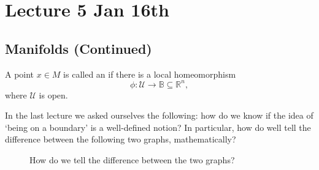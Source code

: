 \documentclass[notoc,notitlepage]{tufte-book}
\begin{document}


%
\label{prt:introduction_to_topological_manifolds}

\chapter{Lecture 5 Jan 16th}%
\label{chp:lecture_5_jan_16th}

\section{Manifolds (Continued)}%
\label{sec:manifolds_continued}

\begin{defn}\label{defn:interior_point}
  A point $x \in M$ is called an  if there is a local
  homeomorphism
  \begin{equation*}
    \phi : \mathcal{U} \to \mathbb{B} \subseteq \mathbb{R}^n,
  \end{equation*}
  where $\mathcal{U}$ is open.
\end{defn}

In the last lecture we asked ourselves the following: how do we know if the
idea of `being on a boundary' is a well-defined notion? In particular, how
do well tell the difference between the following two graphs, mathematically?

\begin{figure}[ht]
  \centering
  \caption{How do we tell the difference between the two graphs?}
  \label{fig:r_n_vs_h_n}
\end{figure}
\end{document}
